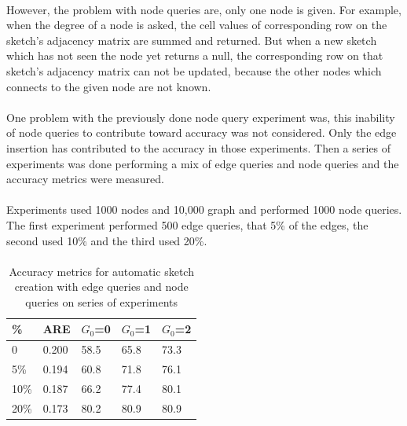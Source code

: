 \documentclass[12pt]{report}
\numberwithin{figure}{section}
\numberwithin{table}{section}
\begin{document}
\paragraph{}

However, the problem with node queries are, only one node is given. For example, when the degree of a node is asked, the cell values of corresponding row on the sketch's adjacency matrix are summed and returned. But when a new sketch which has not seen the node yet returns a null, the corresponding row on that sketch's adjacency matrix  can not be updated, because the other nodes which connects to the given node are not known. 

\paragraph{}

One problem with the previously done node query experiment was, this inability of node queries to contribute toward accuracy was not considered. Only the edge insertion has contributed to the accuracy in those experiments. Then a series of experiments was done performing a mix of edge queries and node queries and the accuracy metrics were measured.

\paragraph{}

Experiments used 1000 nodes and 10,000 graph and performed 1000 node queries. The first experiment performed 500 edge queries, that 5\% of the edges, the second used 10\% and the third used 20\%. 

\paragraph{}

\begin{table}[H]
\centering
\begin{tabular}{|l|l|l|l|l|}
\hline
\%    & ARE     & $G_0$=0 & $G_0$=1 & $G_0$=2 \\ \hline
0 & 0.200 &   58.5  &  65.8   &   73.3  \\ \hline
5\% & 0.194 & 60.8   & 71.8   & 76.1  \\ \hline
10\% & 0.187 & 66.2   & 77.4   & 80.1   \\ \hline
20\% & 0.173 & 80.2   & 80.9   & 80.9   \\ \hline
\end{tabular}
\caption{Accuracy metrics for automatic sketch creation  with edge queries and node queries on series of experiments}
\end{table}
\end{document}
